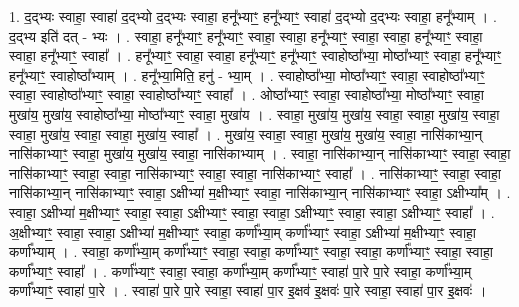 \documentclass[17pt]{extarticle}
\begin{document}
1. द॒द्भ्यः स्वाहा॒ स्वाहा॑ द॒द्भ्यो द॒द्भ्यः स्वाहा॒ हनू᳚भ्याꣳ॒॒ हनू᳚भ्याꣳ॒॒ स्वाहा॑ द॒द्भ्यो द॒द्भ्यः स्वाहा॒ हनू᳚भ्याम् । . द॒द्भ्य इति॑ दत् - भ्यः । . स्वाहा॒ हनू᳚भ्याꣳ॒॒ हनू᳚भ्याꣳ॒॒ स्वाहा॒ स्वाहा॒ हनू᳚भ्याꣳ॒॒ स्वाहा॒ स्वाहा॒ हनू᳚भ्याꣳ॒॒ स्वाहा॒ स्वाहा॒ हनू᳚भ्याꣳ॒॒ स्वाहा᳚ । . हनू᳚भ्याꣳ॒॒ स्वाहा॒ स्वाहा॒ हनू᳚भ्याꣳ॒॒ हनू᳚भ्याꣳ॒॒ स्वाहोष्ठा᳚भ्या॒ मोष्ठा᳚भ्याꣳ॒॒ स्वाहा॒ हनू᳚भ्याꣳ॒॒ हनू᳚भ्याꣳ॒॒ स्वाहोष्ठा᳚भ्याम् । . हनू᳚भ्या॒मिति॒ हनु॑ - भ्या॒म् । . स्वाहोष्ठा᳚भ्या॒ मोष्ठा᳚भ्याꣳ॒॒ स्वाहा॒ स्वाहोष्ठा᳚भ्याꣳ॒॒ स्वाहा॒ स्वाहोष्ठा᳚भ्याꣳ॒॒ स्वाहा॒ 
स्वाहोष्ठा᳚भ्याꣳ॒॒ स्वाहा᳚ । . ओष्ठा᳚भ्याꣳ॒॒ स्वाहा॒ स्वाहोष्ठा᳚भ्या॒ मोष्ठा᳚भ्याꣳ॒॒ स्वाहा॒ मुखा॑य॒ मुखा॑य॒ स्वाहोष्ठा᳚भ्या॒ मोष्ठा᳚भ्याꣳ॒॒ स्वाहा॒ मुखा॑य । . स्वाहा॒ मुखा॑य॒ मुखा॑य॒ स्वाहा॒ स्वाहा॒ मुखा॑य॒ स्वाहा॒ स्वाहा॒ मुखा॑य॒ स्वाहा॒ स्वाहा॒ मुखा॑य॒ स्वाहा᳚ । . मुखा॑य॒ स्वाहा॒ स्वाहा॒ मुखा॑य॒ मुखा॑य॒ स्वाहा॒ नासि॑काभ्या॒न् नासि॑काभ्याꣳ॒॒ स्वाहा॒ मुखा॑य॒ मुखा॑य॒ स्वाहा॒ नासि॑काभ्याम् । . स्वाहा॒ नासि॑काभ्या॒न् नासि॑काभ्याꣳ॒॒ स्वाहा॒ स्वाहा॒ नासि॑काभ्याꣳ॒॒ स्वाहा॒ स्वाहा॒ नासि॑काभ्याꣳ॒॒ स्वाहा॒ स्वाहा॒ नासि॑काभ्याꣳ॒॒ स्वाहा᳚ । . नासि॑काभ्याꣳ॒॒ स्वाहा॒ स्वाहा॒ नासि॑काभ्या॒न् नासि॑काभ्याꣳ॒॒ स्वाहा॒ ऽक्षीभ्या॑ म॒क्षीभ्याꣳ॒॒ स्वाहा॒ नासि॑काभ्या॒न् नासि॑काभ्याꣳ॒॒ स्वाहा॒ ऽक्षीभ्या᳚म् । . स्वाहा॒ ऽक्षीभ्या॑ म॒क्षीभ्याꣳ॒॒ स्वाहा॒ स्वाहा॒ ऽक्षीभ्याꣳ॒॒ स्वाहा॒ स्वाहा॒ ऽक्षीभ्याꣳ॒॒ स्वाहा॒ स्वाहा॒ ऽक्षीभ्याꣳ॒॒ स्वाहा᳚ । . अ॒क्षीभ्याꣳ॒॒ स्वाहा॒ स्वाहा॒ ऽक्षीभ्या॑ म॒क्षीभ्याꣳ॒॒ स्वाहा॒ कर्णा᳚भ्या॒म् कर्णा᳚भ्याꣳ॒॒ स्वाहा॒ ऽक्षीभ्या॑ म॒क्षीभ्याꣳ॒॒ स्वाहा॒ कर्णा᳚भ्याम् । . स्वाहा॒ कर्णा᳚भ्या॒म् कर्णा᳚भ्याꣳ॒॒ स्वाहा॒ स्वाहा॒ कर्णा᳚भ्याꣳ॒॒ स्वाहा॒ स्वाहा॒ कर्णा᳚भ्याꣳ॒॒ स्वाहा॒ स्वाहा॒ कर्णा᳚भ्याꣳ॒॒ स्वाहा᳚ । . कर्णा᳚भ्याꣳ॒॒ स्वाहा॒ स्वाहा॒ कर्णा᳚भ्या॒म् कर्णा᳚भ्याꣳ॒॒ स्वाहा॑ पा॒रे पा॒रे स्वाहा॒ कर्णा᳚भ्या॒म् कर्णा᳚भ्याꣳ॒॒ स्वाहा॑ पा॒रे । . स्वाहा॑ पा॒रे पा॒रे स्वाहा॒ स्वाहा॑ पा॒र इ॒क्षव॑ इ॒क्षवः॑ पा॒रे स्वाहा॒ स्वाहा॑ पा॒र इ॒क्षवः॑ । \newline
\end{document}
